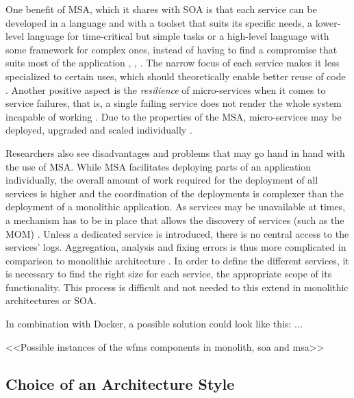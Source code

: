     One benefit of \ac{MSA}, which it shares with \ac{SOA} is that each service can be developed in a language and with a toolset that suits its specific needs, \eg a lower-level language for time-critical but simple tasks or a high-level language with some framework for complex ones, instead of having to find a compromise that suits most of the application  \cite[p.~35]{Stubbs2015Distributed}, \cite[p.~4]{Newman2015Building}, \cite[p.~113]{Thones2015Microservices}.
    The narrow focus of each service makes it less specialized to certain uses, which should theoretically enable better reuse of code \cite[p.~35]{Stubbs2015Distributed}.
    Another positive aspect is the \emph{resilience} of micro-services when it comes to service failures, that is, a single failing service does not render the whole system incapable of working \cite[p.~5]{Newman2015Building}.
    Due to the properties of the \ac{MSA}, micro-services may be deployed, upgraded and scaled individually \cite[p.~116]{Thones2015Microservices}.

    Researchers also see disadvantages and problems that may go hand in hand with the use of \ac{MSA}.
    While \ac{MSA} facilitates deploying parts of an application individually, the overall amount of work required for the deployment of all services is higher and the coordination of the deployments is complexer than the deployment of a monolithic application.
    As services may be unavailable at times, a mechanism has to be in place that allows the discovery of services (such as the \ac{MOM}) \cite[p.~35]{Stubbs2015Distributed}.
    Unless a dedicated service is introduced, there is no central access to the services' logs. Aggregation, analysis and fixing errors is thus more complicated in comparison to monolithic architecture \cite[p.~35]{Stubbs2015Distributed}.
    In order to define the different services, it is necessary to find the right size for each service, \ie the appropriate scope of its functionality. This process is difficult and not needed to this extend in monolithic architectures or \ac{SOA}.

    In combination with Docker, a possible solution could look like this: ...

  <<Possible instances of the wfms components in monolith, soa and msa>>

\subsection{Choice of an Architecture Style} %
  \label{sub:choice_of_an_achitecture_model}

